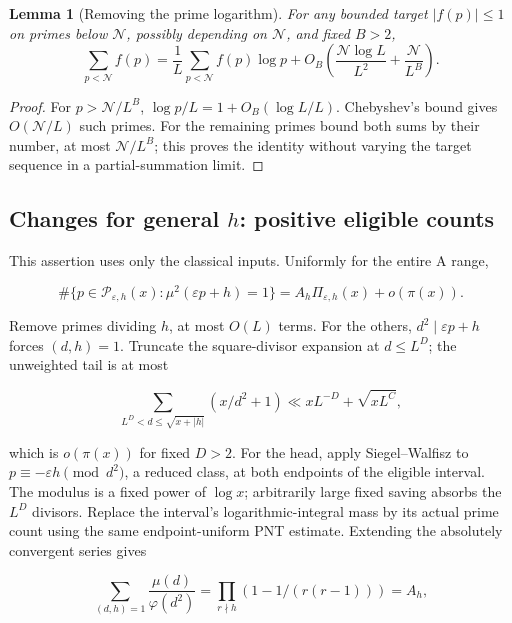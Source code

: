 \documentclass[11pt]{article}
\newtheorem{lemma}[theorem]{Lemma}
\theoremstyle{definition}
\newcommand{\GN}{\mathcal N}
\theoremstyle{remark}
\numberwithin{equation}{section}
\begin{document}
\begin{lemma}[Removing the prime logarithm]\label{lem:unweight}
For any bounded target $|f(p)|\le1$ on primes below $\GN$, possibly
depending on $\GN$, and fixed $B>2$,
\begin{equation}\label{eq:unweight}
 \sum_{p<\GN}f(p)
 =\frac1L\sum_{p<\GN}f(p)\log p
 +O_B\left(\frac{\GN\log L}{L^2}+\frac{\GN}{L^B}\right).
\end{equation}
\end{lemma}
\begin{proof}
For $p>\GN/L^B$, $\log p/L=1+O_B(\log L/L)$.
Chebyshev's bound gives $O(\GN/L)$ such primes.
For the remaining primes bound both sums by their number, at most
$\GN/L^B$; this proves the identity without varying the target
sequence in a partial-summation limit.
\end{proof}

\subsection{Changes for general \texorpdfstring{$h$}{h}: positive eligible counts}\label{subsec:general-density}
This assertion uses only the classical inputs. Uniformly for the entire A range,


\begin{equation}\label{v2:7-2}
\#\{p\in\mathcal P_{\varepsilon,h}(x):\mu^2(\varepsilon p+h)=1\}
=A_h\Pi_{\varepsilon,h}(x)+o(\pi(x)).
\end{equation}


Remove primes dividing $h$, at most $O(L)$ terms. For the others, $d^2\mid\varepsilon p+h$ forces $(d,h)=1$. Truncate the square-divisor expansion at $d\le L^D$; the unweighted tail is at most


\begin{equation}
\sum_{L^D<d\le\sqrt{x+|h|}}(x/d^2+1)
\ll xL^{-D}+\sqrt{xL^C},
\end{equation}


which is $o(\pi(x))$ for fixed $D>2$. For the head, apply Siegel–Walfisz to $p\equiv-\varepsilon h\pmod{d^2}$, a reduced class, at both endpoints of the eligible interval. The modulus is a fixed power of $\log x$; arbitrarily large fixed saving absorbs the $L^D$ divisors. Replace the interval's logarithmic-integral mass by its actual prime count using the same endpoint-uniform PNT estimate. Extending the absolutely convergent series gives


\begin{equation}
\sum_{(d,h)=1}\frac{\mu(d)}{\varphi(d^2)}
=\prod_{r\nmid h}(1-1/(r(r-1)))=A_h,
\end{equation}
\end{document}
